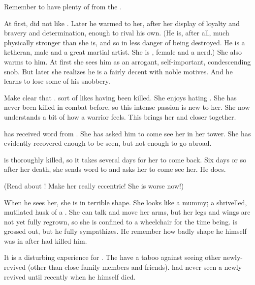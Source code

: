 

Remember to have plenty of  from the \resphain. 

At first, \Teshrial did not like \Urizeth.
Later he warmed to her, after her display of loyalty and bravery and determination, enough to rival his own. 
(He is, after all, much physically stronger than she is, and so in less danger of being destroyed. He is a ketheran, male and a great martial artist. She is \thelyad, female and a nerd.)
She also warms to him.
At first she sees him as an arrogant, self-important, condescending snob.
But later she realizes he is a fairly decent \resphan with noble motives.
And he learns to lose some of his snobbery.

Make clear that .
\Urizeth sort of likes having been killed. 
She enjoys hating \Ishnaruchaefir. 
She has never been killed in combat before, so this intense passion is new to her. 
She now understands a bit of how a warrior feels. 
This brings her and \Teshrial closer together. 

\begin{comment}
  \section{Teshrial meets Urizeth}
\end{comment}

\Teshrial has received word from \Urizeth. 
She has asked him to come see her in her tower. 
She has evidently recovered enough to be seen, but not enough to go abroad. 

\Urizeth{} is thoroughly killed, so it takes several days for her to come back. 
Six days or so after her death, she sends word to \Teshrial{} and asks her to come see her. 
He does. 

(Read about \Urizeth! Make her really eccentric! She is worse now!)

When he sees her, she is in terrible shape. 
She looks like a mummy; a shrivelled, mutilated husk of a \resvil. 
She can talk and move her arms, but her legs and wings are not yet fully regrown, so she is confined to a wheelchair for the time being. 
\Teshrial{} is grossed out, but he fully sympathizes. 
He remember how badly shape he himself was in after \Ishnaruchaefir{} had killed him. 

It is a disturbing experience for \Teshrial.
The \CiriathSepher have a taboo against seeing other newly-revived \resphain (other than close family members and friends).
\Teshrial had never seen a newly revived until recently when he himself died.

